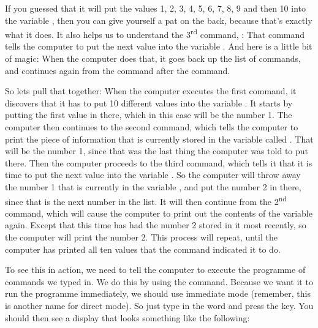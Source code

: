 If you guessed
that it will put the values 1, 2, 3, 4, 5, 6, 7, 8, 9 and then 10 into the variable , then you
can give yourself a pat on the back, because that's exactly what it does.  It also helps us to
understand the 3\textsuperscript{rd} command, : That command tells the computer to put the next value into
the variable .  And here is a little bit of magic: When the computer does that, it goes back
up the list of commands, and continues again from the command after the  command.

So lets pull that together: When the computer executes the first command, it discovers that it has
to put 10 different values into the variable . It starts by putting the first value in there, which
in this case will be the number 1.
The computer then continues to the second command, which tells the computer to print the piece of
information that is currently stored in the variable called . That will be the number 1, since
that was the last thing the computer was told to put there.  Then the computer proceeds to the
third command, which tells it that it is time to put the next value into the variable .  So the
computer will throw away the number 1 that is currently in the variable , and put the number 2 in
there, since that is the next number in the list.  It will then continue from the 2\textsuperscript{nd} command,
which will cause the computer to print out the contents of the variable  again.  Except that this
time  has had the number 2 stored in it most recently, so the computer will print the number 2.
This process will repeat, until the computer has printed all ten values that the  command
indicated it to do.

\needspace{4cm} %
To see this in action, we need to tell the computer to execute the programme of commands we typed in.
We do this by using the  command. Because we want it to run the programme immediately, we
should use immediate mode (remember, this is another name for direct mode).
So just type in the word  and press the  key.  You should then see a display
that looks something like the following:


